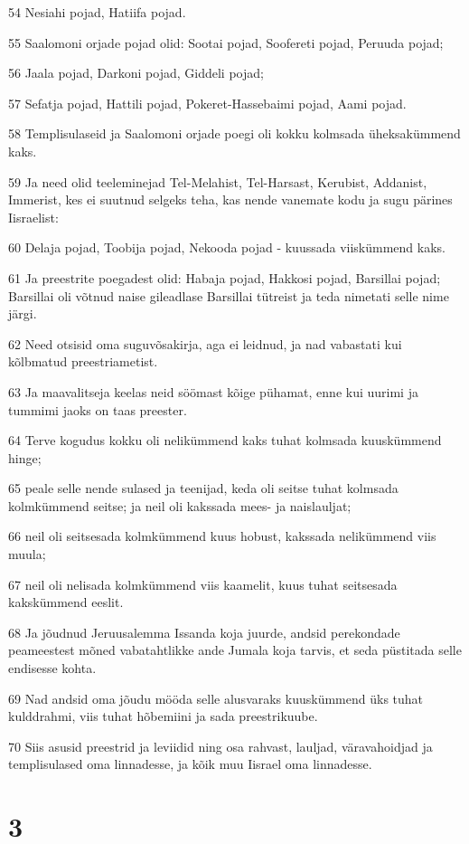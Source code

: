 \par 54 Nesiahi pojad, Hatiifa pojad.
\par 55 Saalomoni orjade pojad olid: Sootai pojad, Soofereti pojad, Peruuda pojad;
\par 56 Jaala pojad, Darkoni pojad, Giddeli pojad;
\par 57 Sefatja pojad, Hattili pojad, Pokeret-Hassebaimi pojad, Aami pojad.
\par 58 Templisulaseid ja Saalomoni orjade poegi oli kokku kolmsada üheksakümmend kaks.
\par 59 Ja need olid teeleminejad Tel-Melahist, Tel-Harsast, Kerubist, Addanist, Immerist, kes ei suutnud selgeks teha, kas nende vanemate kodu ja sugu pärines Iisraelist:
\par 60 Delaja pojad, Toobija pojad, Nekooda pojad - kuussada viiskümmend kaks.
\par 61 Ja preestrite poegadest olid: Habaja pojad, Hakkosi pojad, Barsillai pojad; Barsillai oli võtnud naise gileadlase Barsillai tütreist ja teda nimetati selle nime järgi.
\par 62 Need otsisid oma suguvõsakirja, aga ei leidnud, ja nad vabastati kui kõlbmatud preestriametist.
\par 63 Ja maavalitseja keelas neid söömast kõige pühamat, enne kui uurimi ja tummimi jaoks on taas preester.
\par 64 Terve kogudus kokku oli nelikümmend kaks tuhat kolmsada kuuskümmend hinge;
\par 65 peale selle nende sulased ja teenijad, keda oli seitse tuhat kolmsada kolmkümmend seitse; ja neil oli kakssada mees- ja naislauljat;
\par 66 neil oli seitsesada kolmkümmend kuus hobust, kakssada nelikümmend viis muula;
\par 67 neil oli nelisada kolmkümmend viis kaamelit, kuus tuhat seitsesada kakskümmend eeslit.
\par 68 Ja jõudnud Jeruusalemma Issanda koja juurde, andsid perekondade peameestest mõned vabatahtlikke ande Jumala koja tarvis, et seda püstitada selle endisesse kohta.
\par 69 Nad andsid oma jõudu mööda selle alusvaraks kuuskümmend üks tuhat kulddrahmi, viis tuhat hõbemiini ja sada preestrikuube.
\par 70 Siis asusid preestrid ja leviidid ning osa rahvast, lauljad, väravahoidjad ja templisulased oma linnadesse, ja kõik muu Iisrael oma linnadesse.

\chapter{3}

